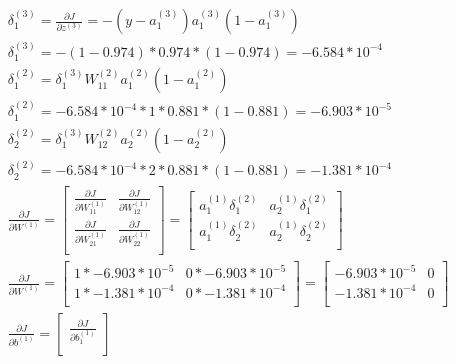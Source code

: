 \documentclass[leqno]{article}
\begin{document}
\begin{gather*}
\begin{split}
&\delta_1^{(3)} = \frac{\partial J}{\partial z^{(3)}} = %
  -(y - a_1^{(3)})a_1^{(3)}(1 - a_1^{(3)})\\
&\delta_1^{(3)} = -(1 - 0.974)*0.974*(1 - 0.974) = -6.584*10^{-4}\\
&\delta_1^{(2)} = %
  \delta_1^{(3)}W_{11}^{(2)}a_1^{(2)}(1 - a_1^{(2)})\\
&\delta_1^{(2)} = -6.584*10^{-4}*1*0.881*(1 - 0.881) = -6.903*10^{-5}\\
&\delta_2^{(2)} = %
  \delta_1^{(3)}W_{12}^{(2)}a_2^{(2)}(1 - a_2^{(2)})\\
&\delta_2^{(2)} = -6.584*10^{-4}*2*0.881*(1 - 0.881) = -1.381*10^{-4}\\ 
&\frac{\partial J}{\partial W^{(1)}} = 
 \begin{bmatrix}
   \frac{\partial J}{\partial W_{11}^{(1)}} & \frac{\partial J}{\partial W_{12}^{(1)}}\\ 
  \frac{\partial J}{\partial W_{21}^{(1)}} & \frac{\partial J}{\partial W_{22}^{(1)}}\\
  \end{bmatrix}
   =
 \begin{bmatrix}
   a_1^{(1)}\delta_1^{(2)} & a_2^{(1)}\delta_1^{(2)}\\ 
   a_1^{(1)}\delta_2^{(2)} & a_2^{(1)}\delta_2^{(2)}\\
  \end{bmatrix}\\
& \frac{\partial J}{\partial W^{(1)}} =
  \begin{bmatrix}
   1*-6.903*10^{-5} & 0*-6.903*10^{-5}\\ 
   1*-1.381*10^{-4} & 0*-1.381*10^{-4}\\
  \end{bmatrix}
 =
  \begin{bmatrix}
   -6.903*10^{-5} & 0\\ 
   -1.381*10^{-4} & 0\\
  \end{bmatrix}
\\
&\frac{\partial J}{\partial b^{(1)}} = 
 \begin{bmatrix}
   \frac{\partial J}{\partial b_1^{(1)}}\\ 

\end{bmatrix}
\end{split}
\end{gather*}
\end{document}
